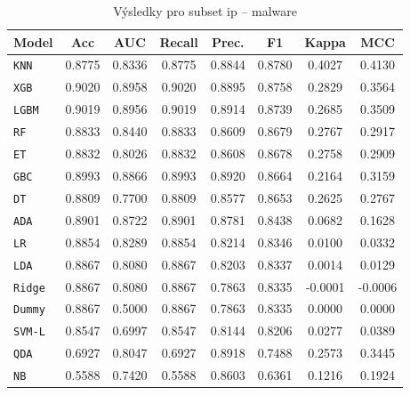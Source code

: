 \begin{table}[H]
  \centering
  \small
  \caption{Výsledky pro subset ip – malware}
  \begin{tabular}{|l|c|c|c|c|c|c|c|}
    \hline
    \textbf{Model} & \textbf{Acc} & \textbf{AUC} & \textbf{Recall} & \textbf{Prec.} & \textbf{F1} & \textbf{Kappa} & \textbf{MCC} \\
    \hline
    \texttt{KNN} & 0.8775 & 0.8336 & 0.8775 & 0.8844 & 0.8780 & 0.4027 & 0.4130 \\
    \texttt{XGB} & 0.9020 & 0.8958 & 0.9020 & 0.8895 & 0.8758 & 0.2829 & 0.3564 \\
    \texttt{LGBM} & 0.9019 & 0.8956 & 0.9019 & 0.8914 & 0.8739 & 0.2685 & 0.3509 \\
    \texttt{RF} & 0.8833 & 0.8440 & 0.8833 & 0.8609 & 0.8679 & 0.2767 & 0.2917 \\
    \texttt{ET} & 0.8832 & 0.8026 & 0.8832 & 0.8608 & 0.8678 & 0.2758 & 0.2909 \\
    \texttt{GBC} & 0.8993 & 0.8866 & 0.8993 & 0.8920 & 0.8664 & 0.2164 & 0.3159 \\
    \texttt{DT} & 0.8809 & 0.7700 & 0.8809 & 0.8577 & 0.8653 & 0.2625 & 0.2767 \\
    \texttt{ADA} & 0.8901 & 0.8722 & 0.8901 & 0.8781 & 0.8438 & 0.0682 & 0.1628 \\
    \texttt{LR} & 0.8854 & 0.8289 & 0.8854 & 0.8214 & 0.8346 & 0.0100 & 0.0332 \\
    \texttt{LDA} & 0.8867 & 0.8080 & 0.8867 & 0.8203 & 0.8337 & 0.0014 & 0.0129 \\
    \texttt{Ridge} & 0.8867 & 0.8080 & 0.8867 & 0.7863 & 0.8335 & -0.0001 & -0.0006 \\
    \texttt{Dummy} & 0.8867 & 0.5000 & 0.8867 & 0.7863 & 0.8335 & 0.0000 & 0.0000 \\
    \texttt{SVM-L} & 0.8547 & 0.6997 & 0.8547 & 0.8144 & 0.8206 & 0.0277 & 0.0389 \\
    \texttt{QDA} & 0.6927 & 0.8047 & 0.6927 & 0.8918 & 0.7488 & 0.2573 & 0.3445 \\
    \texttt{NB} & 0.5588 & 0.7420 & 0.5588 & 0.8603 & 0.6361 & 0.1216 & 0.1924 \\
    \hline
  \end{tabular}
\end{table}
\vspace{0.5cm}

